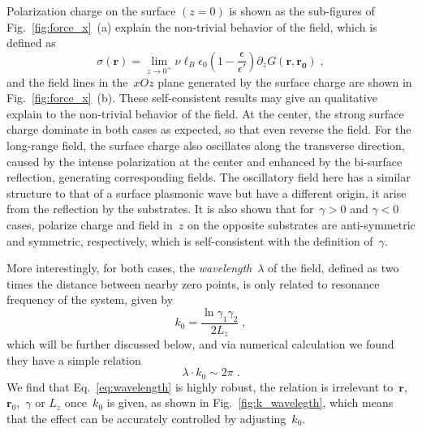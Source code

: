 \documentclass[aps,prl,reprint,showpacs,floatfix,superscriptaddress]{revtex4-2}
\newcommand{\V}[1]{\boldsymbol{#1}} %
\newcommand{\eps}{\epsilon}
\begin{document}
Polarization charge on the surface $(z = 0)$ is shown as the sub-figures of Fig.~\ref{fig:force_x}~(a) explain the non-trivial behavior of the field, which is defined as 
\begin{equation}
    \sigma(\V{r}) = \lim_{z \to 0^+} \nu \ell_B \eps_0  \left( 1 - \frac{\eps}{\eps'} \right) \partial_z G(\V{r}, \V{r_0})\;,
\end{equation}
and the field lines in the~$xOz$ plane generated by the surface charge are shown in Fig.~\ref{fig:force_x}~(b).
These self-consistent results may give an qualitative explain to the non-trivial behavior of the field.
At the center, the strong surface charge dominate in both cases as expected, so that even reverse the field.
For the long-range field, the surface charge also oscillates along the transverse direction, caused by the intense polarization at the center and enhanced by the bi-surface reflection, generating corresponding fields.
The oscillatory field here has a similar structure to that of a surface plasmonic wave but have a different origin, it arise from the reflection by the substrates.
It is also shown that for~$\gamma > 0$ and $\gamma < 0$ cases, polarize charge and field in~$z$ on the opposite substrates are anti-symmetric and symmetric, respectively, which is self-consistent with the definition of~$\gamma$.

More interestingly, for both cases, the \emph{wavelength}~$\lambda$ of the field, defined as two times the distance between nearby zero points, is only related to resonance frequency of the system, given by
\begin{equation}\label{eq:k0}
    k_0 = \frac{\ln{\gamma_1 \gamma_2}}{2 L_z}\;,
\end{equation}
which will be further discussed below, and via numerical calculation we found they have a simple relation
\begin{equation}\label{eq:wavelength}
    \lambda \cdot k_0 \sim 2 \pi \;.
\end{equation}
We find that Eq.~\eqref{eq:wavelength} is highly robust, the relation is irrelevant to~$\V{r}$,~$\V{r}_0$,~$\gamma$ or $L_z$ once~$k_0$ is given, as shown in Fig.~\ref{fig:k_wavelegth}, which means that the effect can be accurately controlled by adjusting~$k_0$.
\end{document}
